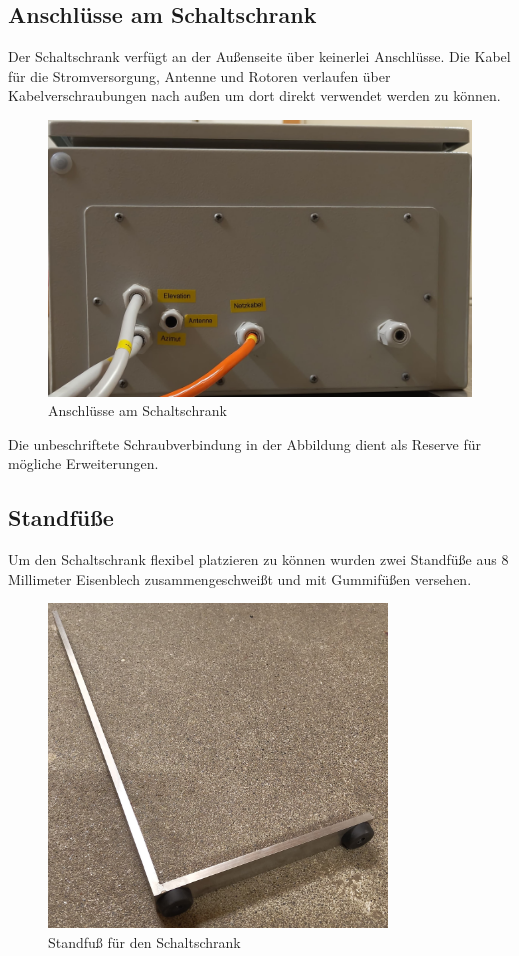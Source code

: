 \subsection{Anschlüsse am Schaltschrank}
Der Schaltschrank verfügt an der Außenseite über keinerlei Anschlüsse. Die Kabel für die Stromversorgung, Antenne und Rotoren verlaufen über Kabelverschraubungen nach außen um dort direkt verwendet werden zu können. 

\begin{figure}[H]
	\centering
	\includegraphics[width=0.7\linewidth]{../ref/Schaltschrank_Anschluss.jpeg}
	\caption{Anschlüsse am Schaltschrank}
	\label{fig:schaltschrankanschluesse}
\end{figure}

Die unbeschriftete Schraubverbindung in der Abbildung dient als Reserve für mögliche Erweiterungen.

\subsection{Standfüße}
Um den Schaltschrank flexibel platzieren zu können wurden zwei Standfüße aus 8 Millimeter Eisenblech zusammengeschweißt und mit Gummifüßen versehen. 

\begin{figure}[H]
	\centering
	\includegraphics[width=9cm]{../ref/Schaltschrank_Fuss.jpeg}
	\caption{Standfuß für den Schaltschrank}
	\label{fig:schaltschrankfuss}
\end{figure}

